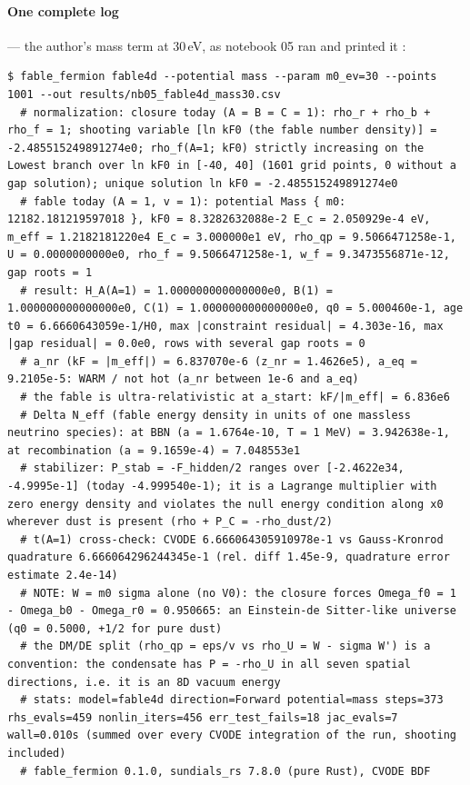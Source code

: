 \paragraph{One complete log} --- the author's mass term at 30\,eV, as notebook 05 ran and printed it
:
\begin{Verbatim}[fontsize=\scriptsize]
$ fable_fermion fable4d --potential mass --param m0_ev=30 --points 1001 --out results/nb05_fable4d_mass30.csv
  # normalization: closure today (A = B = C = 1): rho_r + rho_b + rho_f = 1; shooting variable [ln kF0 (the fable number density)] = -2.485515249891274e0; rho_f(A=1; kF0) strictly increasing on the Lowest branch over ln kF0 in [-40, 40] (1601 grid points, 0 without a gap solution); unique solution ln kF0 = -2.485515249891274e0
  # fable today (A = 1, v = 1): potential Mass { m0: 12182.181219597018 }, kF0 = 8.3282632088e-2 E_c = 2.050929e-4 eV, m_eff = 1.2182181220e4 E_c = 3.000000e1 eV, rho_qp = 9.5066471258e-1, U = 0.0000000000e0, rho_f = 9.5066471258e-1, w_f = 9.3473556871e-12, gap roots = 1
  # result: H_A(A=1) = 1.000000000000000e0, B(1) = 1.000000000000000e0, C(1) = 1.000000000000000e0, q0 = 5.000460e-1, age t0 = 6.6660643059e-1/H0, max |constraint residual| = 4.303e-16, max |gap residual| = 0.0e0, rows with several gap roots = 0
  # a_nr (kF = |m_eff|) = 6.837070e-6 (z_nr = 1.4626e5), a_eq = 9.2105e-5: WARM / not hot (a_nr between 1e-6 and a_eq)
  # the fable is ultra-relativistic at a_start: kF/|m_eff| = 6.836e6
  # Delta N_eff (fable energy density in units of one massless neutrino species): at BBN (a = 1.6764e-10, T = 1 MeV) = 3.942638e-1, at recombination (a = 9.1659e-4) = 7.048553e1
  # stabilizer: P_stab = -F_hidden/2 ranges over [-2.4622e34, -4.9995e-1] (today -4.999540e-1); it is a Lagrange multiplier with zero energy density and violates the null energy condition along x0 wherever dust is present (rho + P_C = -rho_dust/2)
  # t(A=1) cross-check: CVODE 6.666064305910978e-1 vs Gauss-Kronrod quadrature 6.666064296244345e-1 (rel. diff 1.45e-9, quadrature error estimate 2.4e-14)
  # NOTE: W = m0 sigma alone (no V0): the closure forces Omega_f0 = 1 - Omega_b0 - Omega_r0 = 0.950665: an Einstein-de Sitter-like universe (q0 = 0.5000, +1/2 for pure dust)
  # the DM/DE split (rho_qp = eps/v vs rho_U = W - sigma W') is a convention: the condensate has P = -rho_U in all seven spatial directions, i.e. it is an 8D vacuum energy
  # stats: model=fable4d direction=Forward potential=mass steps=373 rhs_evals=459 nonlin_iters=456 err_test_fails=18 jac_evals=7 wall=0.010s (summed over every CVODE integration of the run, shooting included)
  # fable_fermion 0.1.0, sundials_rs 7.8.0 (pure Rust), CVODE BDF
\end{Verbatim}

